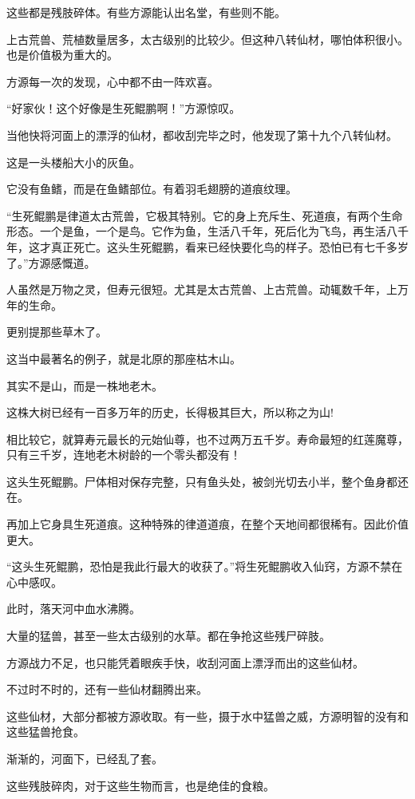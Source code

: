 \begin{this_body}
这些都是残肢碎体。有些方源能认出名堂，有些则不能。

上古荒兽、荒植数量居多，太古级别的比较少。但这种八转仙材，哪怕体积很小。也是价值极为重大的。

方源每一次的发现，心中都不由一阵欢喜。

“好家伙！这个好像是生死鲲鹏啊！”方源惊叹。

当他快将河面上的漂浮的仙材，都收刮完毕之时，他发现了第十九个八转仙材。

这是一头楼船大小的灰鱼。

它没有鱼鳍，而是在鱼鳍部位。有着羽毛翅膀的道痕纹理。

“生死鲲鹏是律道太古荒兽，它极其特别。它的身上充斥生、死道痕，有两个生命形态。一个是鱼，一个是鸟。它作为鱼，生活八千年，死后化为飞鸟，再生活八千年，这才真正死亡。这头生死鲲鹏，看来已经快要化鸟的样子。恐怕已有七千多岁了。”方源感慨道。

人虽然是万物之灵，但寿元很短。尤其是太古荒兽、上古荒兽。动辄数千年，上万年的生命。

更别提那些草木了。

这当中最著名的例子，就是北原的那座枯木山。

其实不是山，而是一株地老木。

这株大树已经有一百多万年的历史，长得极其巨大，所以称之为山!

相比较它，就算寿元最长的元始仙尊，也不过两万五千岁。寿命最短的红莲魔尊，只有三千岁，连地老木树龄的一个零头都没有！

这头生死鲲鹏。尸体相对保存完整，只有鱼头处，被剑光切去小半，整个鱼身都还在。

再加上它身具生死道痕。这种特殊的律道道痕，在整个天地间都很稀有。因此价值更大。

“这头生死鲲鹏，恐怕是我此行最大的收获了。”将生死鲲鹏收入仙窍，方源不禁在心中感叹。

此时，落天河中血水沸腾。

大量的猛兽，甚至一些太古级别的水草。都在争抢这些残尸碎肢。

方源战力不足，也只能凭着眼疾手快，收刮河面上漂浮而出的这些仙材。

不过时不时的，还有一些仙材翻腾出来。

这些仙材，大部分都被方源收取。有一些，摄于水中猛兽之威，方源明智的没有和这些猛兽抢食。

渐渐的，河面下，已经乱了套。

这些残肢碎肉，对于这些生物而言，也是绝佳的食粮。


\end{this_body}
